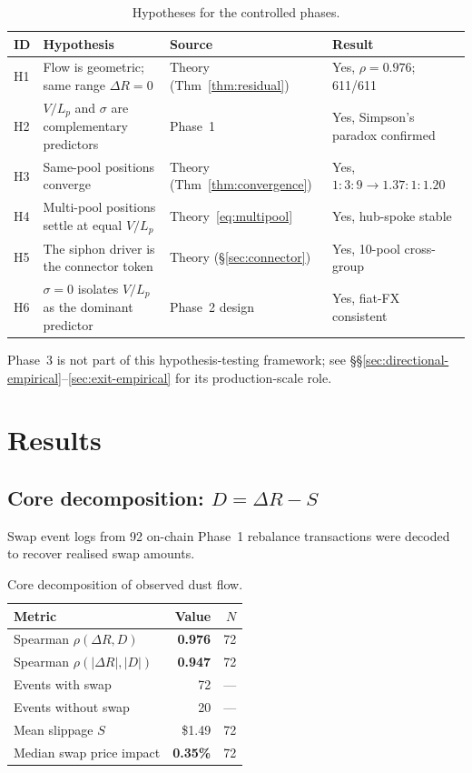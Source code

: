 \documentclass{manuscript}
\begin{document}
\begin{table}[H]
\centering
\caption{Hypotheses for the controlled phases.}
\label{tab:hypotheses}
\begin{tabular}{@{}lL{6.4cm}lL{4cm}@{}}
\toprule
ID & Hypothesis & Source & Result \\
\midrule
H1 & Flow is geometric; same range $\Delta R = 0$ & Theory (Thm~\ref{thm:residual}) & Yes, $\rho = 0.976$; 611/611 \\
H2 & $V/L_p$ and $\sigma$ are complementary predictors & Phase~1 & Yes, Simpson's paradox confirmed \\
H3 & Same-pool positions converge & Theory (Thm~\ref{thm:convergence}) & Yes, $1{:}3{:}9 \to 1.37{:}1{:}1.20$ \\
H4 & Multi-pool positions settle at equal $V/L_p$ & Theory~\eqref{eq:multipool} & Yes, hub-spoke stable \\
H5 & The siphon driver is the connector token & Theory (\S\ref{sec:connector}) & Yes, 10-pool cross-group \\
H6 & $\sigma = 0$ isolates $V/L_p$ as the dominant predictor & Phase~2 design & Yes, fiat-FX consistent \\
\bottomrule
\end{tabular}
\end{table}

\noindent Phase~3 is not part of this hypothesis-testing framework; see \S\S\ref{sec:directional-empirical}--\ref{sec:exit-empirical} for its production-scale role.

\section{Results}\label{sec:results}

\subsection{Core decomposition: \texorpdfstring{$D = \Delta R - S$}{D = Delta R - S}}\label{sec:decomposition}

Swap event logs from 92 on-chain Phase~1 rebalance transactions were decoded to recover realised swap amounts.

\begin{table}[H]
\centering
\caption{Core decomposition of observed dust flow.}
\label{tab:decomposition}
\begin{tabular}{@{}lrr@{}}
\toprule
Metric & Value & $N$ \\
\midrule
Spearman $\rho(\Delta R, D)$     & \textbf{0.976} & 72 \\
Spearman $\rho(|\Delta R|, |D|)$ & \textbf{0.947} & 72 \\
Events with swap                 & 72             & --- \\
Events without swap              & 20             & --- \\
Mean slippage $S$                & \$1.49         & 72 \\
Median swap price impact         & \textbf{0.35\%} & 72 \\
\bottomrule
\end{tabular}
\end{table}
\end{document}
